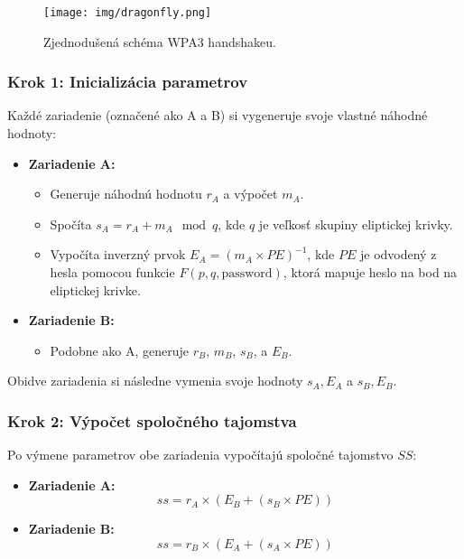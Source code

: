 \documentclass[12pt, twoside]{book}
\begin{document}
\begin{figure}[H] 
    \centering
    \texttt{[image: img/dragonfly.png]}
    \caption{Zjednodušená schéma WPA3 handshakeu.}
    \label{fig:dragonfly}
\end{figure}

\subsubsection{Krok 1: Inicializácia parametrov}
Každé zariadenie (označené ako A a B) si vygeneruje svoje vlastné náhodné hodnoty:
\begin{itemize}
    \item \textbf{Zariadenie A:}
        \begin{itemize}
            \item Generuje náhodnú hodnotu \( r_A \) a výpočet \( m_A \).
            \item Spočíta \( s_A = r_A + m_A \mod q \), kde \( q \) je veľkosť skupiny eliptickej krivky.
            \item Vypočíta inverzný prvok \( E_A = (m_A \times PE)^{-1} \), kde \( PE \) je odvodený z hesla pomocou funkcie \( F(p, q, \text{password}) \), ktorá mapuje heslo na bod na eliptickej krivke.
        \end{itemize}
    \item \textbf{Zariadenie B:}
        \begin{itemize}
            \item Podobne ako A, generuje \( r_B \), \( m_B \), \( s_B \), a \( E_B \).
        \end{itemize}
\end{itemize}

Obidve zariadenia si následne vymenia svoje hodnoty \( s_A, E_A \) a \( s_B, E_B \).

\subsubsection{Krok 2: Výpočet spoločného tajomstva}

Po výmene parametrov obe zariadenia vypočítajú spoločné tajomstvo \( SS \):

\begin{itemize}
    \item \textbf{Zariadenie A:} 
    \[
    ss = r_A \times (E_B + (s_B \times PE))
    \]
    \item \textbf{Zariadenie B:} 
    \[
    ss = r_B \times (E_A + (s_A \times PE))
    \]
\end{itemize}
\end{document}
